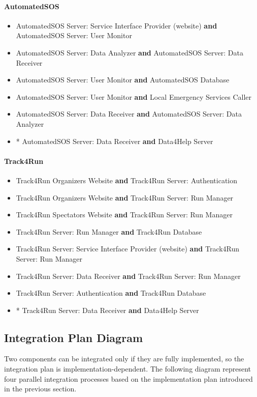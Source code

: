 \documentclass[../DD.tex]{subfiles}
\begin{document}
\paragraph{AutomatedSOS}
\begin{itemize}
	\item{AutomatedSOS Server: Service Interface Provider (website) \textbf{and} AutomatedSOS Server: User Monitor}
	\item{AutomatedSOS Server: Data Analyzer \textbf{and} AutomatedSOS Server: Data Receiver}
	\item{AutomatedSOS Server: User Monitor \textbf{and} AutomatedSOS Database}
	\item{AutomatedSOS Server: User Monitor \textbf{and} Local Emergency Services Caller}
	\item{AutomatedSOS Server: Data Receiver \textbf{and} AutomatedSOS Server: Data Analyzer}
	\item{* AutomatedSOS Server: Data Receiver \textbf{and} Data4Help Server}
\end{itemize}

\paragraph{Track4Run}
\begin{itemize}
	\item{Track4Run Organizers Website \textbf{and} Track4Run Server: Authentication}
	\item{Track4Run Organizers Website \textbf{and} Track4Run Server: Run Manager}
	\item{Track4Run Spectators Website \textbf{and} Track4Run Server: Run Manager}
	\item{Track4Run Server: Run Manager \textbf{and} Track4Run Database}
	\item{Track4Run Server: Service Interface Provider (website) \textbf{and} Track4Run Server: Run Manager}
	\item{Track4Run Server: Data Receiver \textbf{and} Track4Run Server: Run Manager}
	\item{Track4Run Server: Authentication \textbf{and} Track4Run Database}
	\item{* Track4Run Server: Data Receiver \textbf{and} Data4Help Server}
\end{itemize}

\subsection{Integration Plan Diagram}
Two components can be integrated only if they are fully implemented, so the integration plan is implementation-dependent. The following diagram represent four parallel integration processes based on the implementation plan introduced in the previous section.
\end{document}
